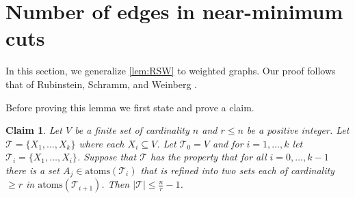\documentclass[10pt,a4paper]{article}
\newcommand{\Tcal}{\mathcal{T}}
\newcommand{\atoms}{\mathrm{atoms}}
\newcommand{\1}{\mathbf{1}}
\newtheorem{claim}[theorem]{Claim}
\theoremstyle{definition}
\begin{document}

\section{Number of edges in near-minimum cuts}
In this section, we generalize \cref{lem:RSW} to weighted graphs.  Our proof follows that of Rubinstein, Schramm, and Weinberg \cite{RSW18}.

\RSWweighted*
Before proving this lemma we first state and prove a claim.
\begin{claim}
\label{clm:sizeK}
Let $V$ be a finite set of cardinality $n$ and $r \le n$ be a positive integer.  Let $\Tcal = \{X_1, \ldots, X_k\}$ where each $X_i \subseteq V$.  Let 
$\Tcal_0 = V$ and for $i = 1, \ldots, k$ let $\Tcal_i = \{X_1, \ldots, X_i\}$.  Suppose that $\Tcal$ has the property that for all $i = 0, \ldots, k-1$ 
there is a set $A_j \in \atoms(\Tcal_i)$ that is refined into two sets each of cardinality $\ge r$ in $\atoms(\Tcal_{i+1})$.  Then $|\Tcal| \le \frac{n}{r}-1$.
\end{claim}
\end{document}
